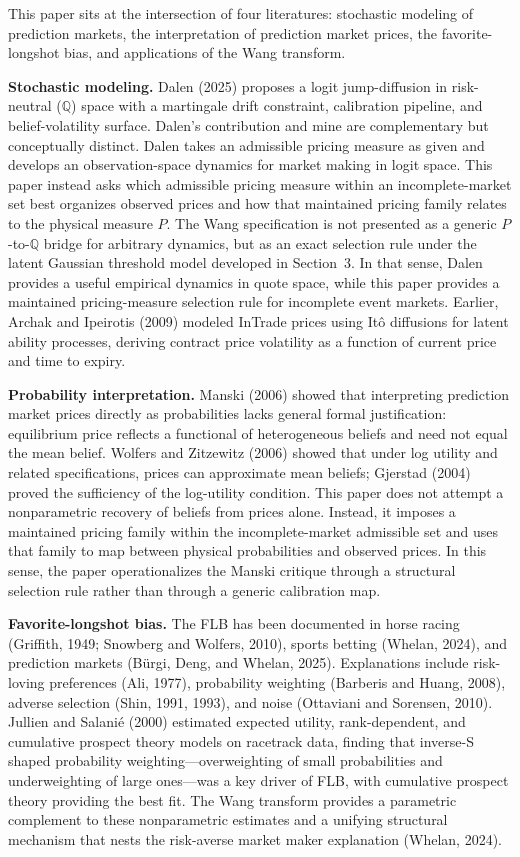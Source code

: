\documentclass[12pt,a4paper]{article}
\begin{document}
This paper sits at the intersection of four literatures: stochastic
modeling of prediction markets, the interpretation of prediction market
prices, the favorite-longshot bias, and applications of the Wang
transform.

\textbf{Stochastic modeling.} Dalen (2025) proposes a logit
jump-diffusion in risk-neutral ($\mathbb{Q}$) space with a martingale
drift constraint, calibration pipeline, and belief-volatility surface.
Dalen's contribution and mine are complementary but conceptually distinct. Dalen takes an admissible pricing measure as given and develops an observation-space dynamics for market making in logit space. This paper instead asks which admissible pricing measure within an incomplete-market set best organizes observed prices and how that maintained pricing family relates to the physical measure $P$. The Wang specification is not presented as a generic $P$-to-$\mathbb{Q}$ bridge for arbitrary dynamics, but as an exact selection rule under the latent Gaussian threshold model developed in Section~3. In that sense, Dalen provides a useful empirical dynamics in quote space, while this paper provides a maintained pricing-measure selection rule for incomplete event markets. Earlier, Archak and Ipeirotis
(2009) modeled InTrade prices using It\^o diffusions for latent ability
processes, deriving contract price volatility as a function of current
price and time to expiry.

\textbf{Probability interpretation.} Manski (2006) showed that interpreting prediction market prices directly as probabilities lacks general formal justification: equilibrium price reflects a functional of heterogeneous beliefs and need not equal the mean belief. Wolfers and Zitzewitz (2006) showed that under log utility and related specifications, prices can approximate mean beliefs; Gjerstad (2004) proved the sufficiency of the log-utility condition. This paper does not attempt a nonparametric recovery of beliefs from prices alone. Instead, it imposes a maintained pricing family within the incomplete-market admissible set and uses that family to map between physical probabilities and observed prices. In this sense, the paper operationalizes the Manski critique through a structural selection rule rather than through a generic calibration map.

\textbf{Favorite-longshot bias.} The FLB has been documented in horse
racing (Griffith, 1949; Snowberg and Wolfers, 2010), sports betting
(Whelan, 2024), and prediction markets (Bürgi, Deng, and Whelan, 2025).
Explanations include risk-loving preferences (Ali, 1977), probability
weighting (Barberis and Huang, 2008), adverse selection (Shin, 1991,
1993), and noise (Ottaviani and Sorensen, 2010). Jullien and Salanié
(2000) estimated expected utility, rank-dependent, and cumulative
prospect theory models on racetrack data, finding that inverse-S shaped
probability weighting---overweighting of small probabilities and
underweighting of large ones---was a key driver of FLB, with cumulative
prospect theory providing the best fit. The Wang transform provides a
parametric complement to these nonparametric estimates and a unifying
structural mechanism that nests the risk-averse market maker explanation
(Whelan, 2024).
\end{document}
